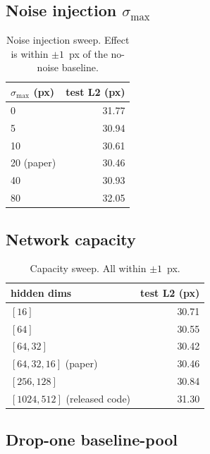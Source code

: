 \subsection{Noise injection $\sigma_{\max}$}

\begin{table}[h]
\centering
\small
\begin{tabular}{lr}
\toprule
$\sigma_{\max}$ (px) & test L2 (px) \\
\midrule
0  & 31.77 \\
5  & 30.94 \\
10 & 30.61 \\
20 (paper) & 30.46 \\
40 & 30.93 \\
80 & 32.05 \\
\bottomrule
\end{tabular}
\caption{Noise injection sweep. Effect is within $\pm 1$~px of the no-noise
baseline.}
\end{table}

\subsection{Network capacity}

\begin{table}[h]
\centering
\small
\begin{tabular}{lr}
\toprule
hidden dims & test L2 (px) \\
\midrule
$[16]$              & 30.71 \\
$[64]$              & 30.55 \\
$[64, 32]$          & 30.42 \\
$[64, 32, 16]$ (paper) & 30.46 \\
$[256, 128]$        & 30.84 \\
$[1024, 512]$ (released code) & 31.30 \\
\bottomrule
\end{tabular}
\caption{Capacity sweep. All within $\pm 1$~px.}
\end{table}

\subsection{Drop-one baseline-pool}

